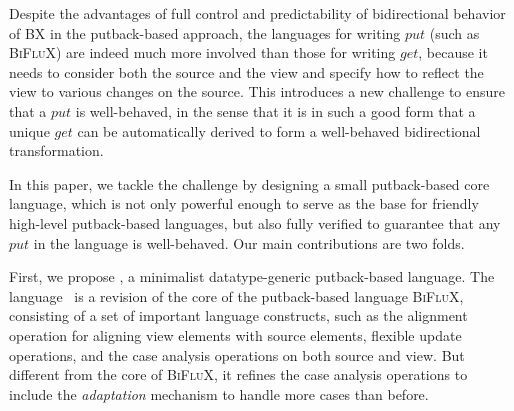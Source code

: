 Despite the advantages of full control and predictability of bidirectional behavior
of BX in the putback-based approach, the languages for writing $put$ (such as \textsc{BiFluX})
are indeed much more involved than those for writing $get$, because it needs to consider both
the source and the view and specify how to reflect the view to various changes on the source.
This introduces a new challenge 
to ensure that a $put$ is well-behaved, in the sense that it is in such a good form that a unique $get$  
can be automatically derived to form a well-behaved bidirectional transformation.
%
%

In this paper, we tackle the challenge by designing 
 a small putback-based core language, 
which is not only  powerful enough  
to serve as the base for friendly high-level putback-based languages,
but also fully verified to guarantee that any $put$ in the language is well-behaved.
Our main contributions are two folds.

First, we propose \BiGUL, a minimalist datatype-generic putback-based language.
The language \BiGUL\ is a revision of the core of the putback-based language 
\textsc{BiFluX}, consisting of a set of important language constructs, such as 
the alignment operation for aligning view elements with source elements, flexible update operations, and %
the case analysis operations on both source and view. 
But different from the core of \textsc{BiFluX},
it refines the case analysis operations to include the {\em adaptation} mechanism 
to handle more cases than before.

